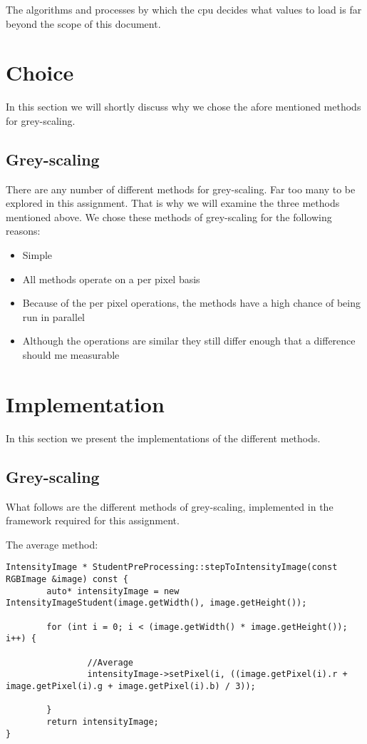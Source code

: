 \documentclass[a4paper]{article}
\begin{document}
The algorithms and processes by which the cpu decides what values to load is far beyond the scope of this document.

\section{Choice}
In this section we will shortly discuss why we chose the afore mentioned methods for grey-scaling.

\subsection{Grey-scaling}
There are any number of different methods for grey-scaling. Far too many to be explored in this assignment. That is why we will examine the three methods mentioned above.
We chose these methods of grey-scaling for the following reasons:

\begin{itemize}
\item Simple
\item All methods operate on a per pixel basis
\item Because of the per pixel operations, the methods have a high chance of being run in parallel
\item Although the operations are similar they still differ enough that a difference should me measurable
\end{itemize}

\newpage

\section{Implementation}
In this section we present the implementations of the different methods.

\subsection{Grey-scaling}
What follows are the different methods of grey-scaling, implemented in the framework required for this assignment.

The average method:
\lstset{language=C++}
\begin{lstlisting}
IntensityImage * StudentPreProcessing::stepToIntensityImage(const RGBImage &image) const {
        auto* intensityImage = new IntensityImageStudent(image.getWidth(), image.getHeight());

        for (int i = 0; i < (image.getWidth() * image.getHeight()); i++) {

                //Average
                intensityImage->setPixel(i, ((image.getPixel(i).r + image.getPixel(i).g + image.getPixel(i).b) / 3));

        }
        return intensityImage;
}

\end{lstlisting}
\end{document}
